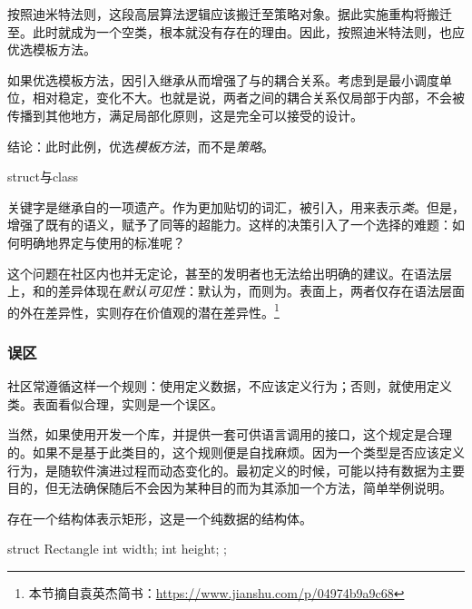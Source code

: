 \begin{content}
按照迪米特法则，这段高层算法逻辑应该搬迁至策略对象。据此实施重构将搬迁至。此时就成为一个空类，根本就没有存在的理由。因此，按照迪米特法则，也应优选模板方法。

如果优选模板方法，因引入继承从而增强了与的耦合关系。考虑到是最小调度单位，相对稳定，变化不大。也就是说，两者之间的耦合关系仅局部于内部，不会被传播到其他地方，满足局部化原则，这是完全可以接受的设计。

结论：此时此例，优选\emph{模板方法}，而不是\emph{策略}。

\begin{episode}{struct与class}
\begin{content}

关键字是\cpp{}继承自\clang{}的一项遗产。作为更加贴切的词汇，被引入\cpp{}，用来表示\emph{类}。但是，\cpp{}增强了既有的语义，赋予了同等的超能力。这样的决策引入了一个选择的难题：如何明确地界定与使用的标准呢？ 

这个问题在社区内也并无定论，甚至\cpp{}的发明者也无法给出明确的建议。在语法层上，和的差异体现在\emph{默认可见性}：默认为，而则为。表面上，两者仅存在语法层面的外在差异性，实则存在价值观的潜在差异性。\footnote{本节摘自袁英杰简书：\href{https://www.jianshu.com/p/04974b9a9c68}{https://www.jianshu.com/p/04974b9a9c68}}

\subsubsection{误区}

社区常遵循这样一个规则：使用定义数据，不应该定义行为；否则，就使用定义类。表面看似合理，实则是一个误区。

当然，如果使用\cpp{}开发一个库，并提供一套可供\clang{}语言调用的接口，这个规定是合理的。如果不是基于此类目的，这个规则便是自找麻烦。因为一个类型是否应该定义行为，是随软件演进过程而动态变化的。最初定义的时候，可能以持有数据为主要目的，但无法确保随后不会因为某种目的而为其添加一个方法，简单举例说明。

存在一个结构体表示矩形，这是一个纯数据的结构体。

\begin{c++}
struct Rectangle {
  int width;
  int height;
};
\end{c++}


\end{content}
\end{episode}
\end{content}
